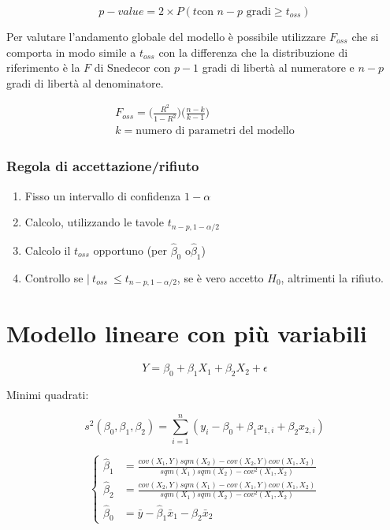 $$
p-value = 2 \times P(t \text{con } n-p \text{ gradi} \geq t_{oss} )
$$

Per valutare l'andamento globale del modello è possibile utilizzare $ F_{oss} $ che si comporta in modo simile a $ t_{oss} $ con la differenza che la distribuzione di riferimento è la $ F $ di Snedecor con $ p-1 $ gradi di libertà al numeratore e $ n-p $ gradi di libertà al denominatore.

\begin{align*}
F_{oss} = \Bigg( \frac{R^2}{ 1 - R^2}\Bigg) \Bigg( \frac{n -k}{k-1} \Bigg) \\
k = \text{numero di parametri del modello}
\end{align*}



\subsubsection{Regola di accettazione/rifiuto}

\begin{enumerate}
	\item Fisso un intervallo di confidenza $ 1-\alpha $
	\item Calcolo, utilizzando le tavole $ t_{n-p, 1-\alpha/2} $
	\item Calcolo il $ t_{oss} $ opportuno (per $ \hat{\beta}_0 $ o$ \hat{\beta}_1 $)
	\item Controllo se $ | \: t_{oss}\: \leq t_{n-p, 1-\alpha/2}  $, se è vero accetto $ H_0 $, altrimenti la rifiuto.
\end{enumerate}



\section{Modello lineare con più variabili}

$$
Y = \beta_0 + \beta_1 X_1+\beta_2X_2 + \epsilon
$$

Minimi quadrati:

$$
s^2(\beta_0, \beta_1, \beta_2) = \sum\limits_{i=1}^n(y_i - \beta_0 + \beta_1 x_{1,i}+\beta_2 x_{2,i} )
$$

$$
\begin{cases}
\hat{\beta}_1 &= \frac{cov(X_1,Y)sqm(X_2) - cov(X_2, Y)cov(X_1,X_2)}{sqm(X_1)sqm(X_2)- cov^2(X_1,X_2)} \\
\hat{\beta}_2 &= \frac{cov(X_2,Y)sqm(X_1) - cov(X_1, Y)cov(X_1,X_2)}{sqm(X_1)sqm(X_2)- cov^2(X_1,X_2)}  \\
\hat{\beta}_0 &= \bar{y} - \hat{\beta}_1\bar{x}_1 - \hat{\beta}_2\bar{x}_2
\end{cases}
$$